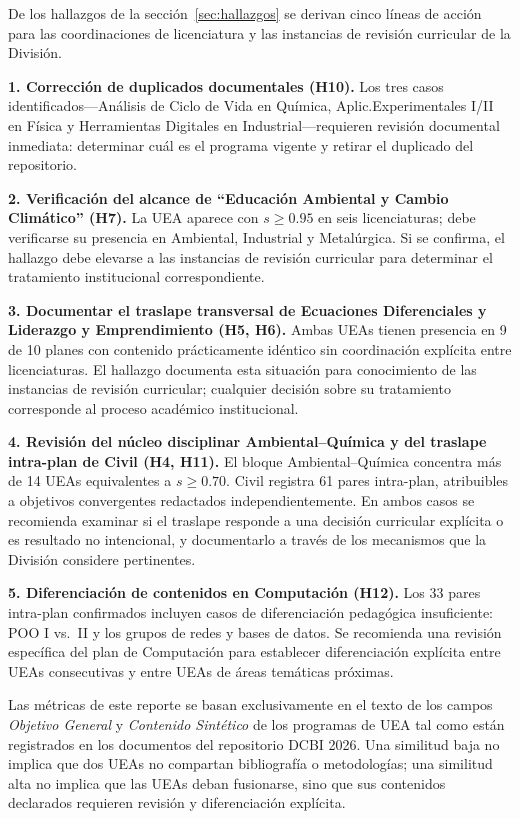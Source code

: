\documentclass[11pt,a4paper]{article}
\begin{document}
De los hallazgos de la sección~\ref{sec:hallazgos} se derivan cinco líneas de acción para las coordinaciones de licenciatura y las instancias de revisión curricular de la División.

\textbf{1. Corrección de duplicados documentales (H10).}
Los tres casos identificados---Análisis de Ciclo de Vida en Química, Aplic.\@ Experimentales I/II en Física y Herramientas Digitales en Industrial---requieren revisión documental inmediata: determinar cuál es el programa vigente y retirar el duplicado del repositorio.

\textbf{2. Verificación del alcance de ``Educación Ambiental y Cambio Climático'' (H7).}
La UEA aparece con $s \geq 0.95$ en seis licenciaturas; debe verificarse su presencia en Ambiental, Industrial y Metalúrgica.
Si se confirma, el hallazgo debe elevarse a las instancias de revisión curricular para determinar el tratamiento institucional correspondiente.

\textbf{3. Documentar el traslape transversal de Ecuaciones Diferenciales y Liderazgo y Emprendimiento (H5, H6).}
Ambas UEAs tienen presencia en 9 de 10 planes con contenido prácticamente idéntico sin coordinación explícita entre licenciaturas.
El hallazgo documenta esta situación para conocimiento de las instancias de revisión curricular; cualquier decisión sobre su tratamiento corresponde al proceso académico institucional.

\textbf{4. Revisión del núcleo disciplinar Ambiental--Química y del traslape intra-plan de Civil (H4, H11).}
El bloque Ambiental--Química concentra más de 14 UEAs equivalentes a $s \geq 0.70$.
Civil registra 61 pares intra-plan, atribuibles a objetivos convergentes redactados independientemente.
En ambos casos se recomienda examinar si el traslape responde a una decisión curricular explícita o es resultado no intencional, y documentarlo a través de los mecanismos que la División considere pertinentes.

\textbf{5. Diferenciación de contenidos en Computación (H12).}
Los 33 pares intra-plan confirmados incluyen casos de diferenciación pedagógica insuficiente: POO I vs.\  II y los grupos de redes y bases de datos.
Se recomienda una revisión específica del plan de Computación para establecer diferenciación explícita entre UEAs consecutivas y entre UEAs de áreas temáticas próximas.

\begin{notabox}
Las métricas de este reporte se basan exclusivamente en el texto de los campos
\textit{Objetivo General} y \textit{Contenido Sintético} de los programas de UEA tal
como están registrados en los documentos del repositorio DCBI 2026.
Una similitud baja no implica que dos UEAs no compartan bibliografía o metodologías;
una similitud alta no implica que las UEAs deban fusionarse, sino que sus contenidos
declarados requieren revisión y diferenciación explícita.
\end{notabox}



\end{document}
